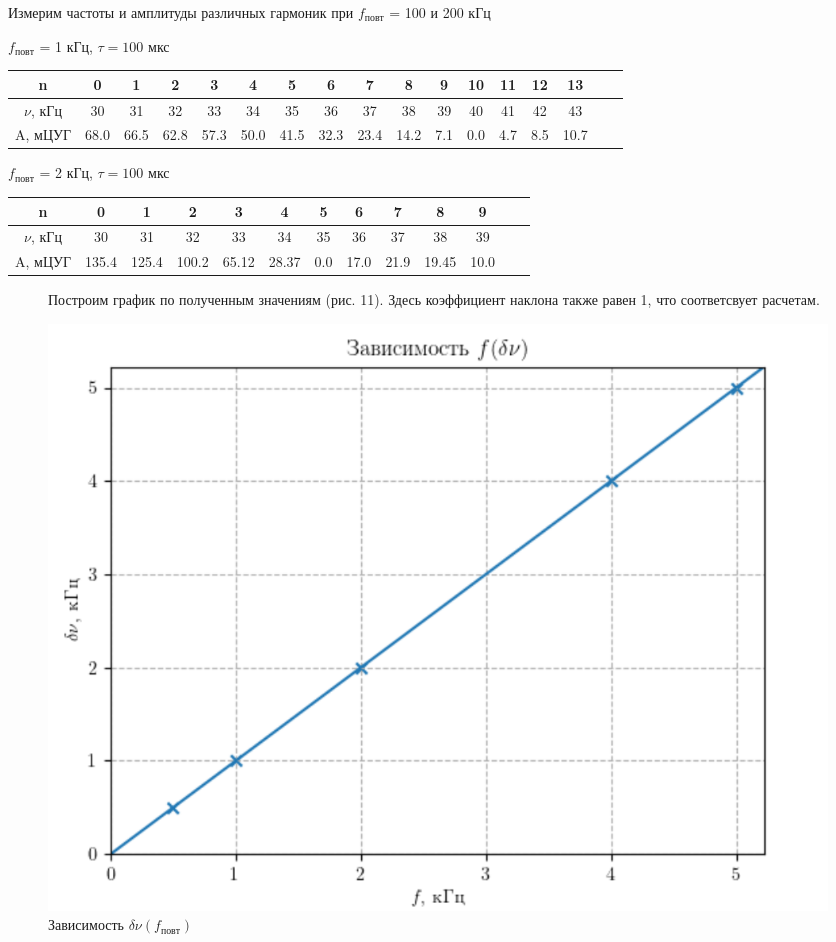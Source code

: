 \documentclass[12pt,a4paper]{article}
\begin{document}
\begin{table}[htp]
    Измерим частоты и амплитуды различных гармоник при $f_{повт}$ = 100 и 200 кГц
    \newline

    \centering
    $f_{повт}$ = 1 кГц, $\tau = 100$ мкс 

    \begin{tabular}[]{|c|c|c|c|c|c|c|c|c|c|c|c|c|c|c|c|c|}
        \hline
        n & 0& 1& 2& 3& 4& 5 & 6& 7 & 8 & 9 &10 & 11 & 12 & 13\\
        \hline
        $\nu$, кГц &  30 & 31& 32& 33&34 & 35 &36&37&38&39&40&41&42&43\\
        \hline
        A, мЦУГ& 68.0& 66.5 & 62.8& 57.3& 50.0 & 41.5 & 32.3 & 23.4 & 14.2 & 7.1 & 0.0 & 4.7& 8.5& 10.7\\
        \hline
    \end{tabular}
    \newline

    $f_{повт}$ = 2 кГц, $\tau = 100$ мкс 

    \begin{tabular}[]{|c|c|c|c|c|c|c|c|c|c|c|c|c|}
        \hline
        n & 0& 1& 2& 3& 4& 5 & 6& 7 & 8 & 9 \\
        \hline
        $\nu$, кГц &  30 & 31& 32& 33&34 & 35 &36&37&38&39\\
        \hline
        A, мЦУГ& 135.4&  125.4& 100.2&65.12 &28.37 & 0.0 & 17.0 &21.9 & 19.45& 10.0\\
        \hline
    \end{tabular}
\end{table}

\begin{figure}[htp]
    Построим график по полученным значениям (рис. 11). 
    Здесь коэффициент наклона также равен 1, что соответсвует расчетам.
    \newline

    \centering
    \includegraphics[width=0.7\linewidth]{f(v).png}
    \caption{Зависимость $\delta\nu (f_{повт})$}
\end{figure}
\end{document}
